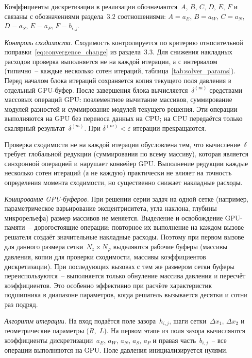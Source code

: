 Коэффициенты дискретизации в реализации обозначаются~$A$, $B$, $C$, $D$, $E$, $F$ и связаны с обозначениями раздела~3.2 соотношениями: $A = a_E$, $B = a_W$, $C = a_N$, $D = a_S$, $E = a_P$, $F = b_{i,j}$.

\textit{Контроль сходимости.}
Сходимость контролируется по критерию относительной поправки~\eqref{eq:convergence_change} из раздела~3.3. Для снижения накладных расходов проверка выполняется не на каждой итерации, а с интервалом (типично~-- каждые несколько сотен итераций, таблица~\ref{tab:solver_params}). Перед началом блока итераций сохраняется копия текущего поля давления в отдельный GPU-буфер. После завершения блока вычисляется~$\delta^{(m)}$ средствами массовых операций GPU: поэлементное вычитание массивов, суммирование модулей разностей и суммирование модулей текущего решения. Эти операции выполняются на GPU без переноса данных на CPU; на CPU передаётся только скалярный результат~$\delta^{(m)}$. При $\delta^{(m)} < \varepsilon$ итерации прекращаются.

Проверка сходимости не на каждой итерации обусловлена тем, что вычисление~$\delta$ требует глобальной редукции (суммирования по всему массиву), которая является синхронной операцией и нарушает конвейер GPU. Выполнение редукции каждые несколько сотен итераций (а не каждую) практически не влияет на точность определения момента сходимости, но существенно снижает накладные расходы.

\textit{Кэширование GPU-буферов.}
При решении серии задач на одной сетке (например, параметрическое варьирование эксцентриситета, угла наклона, глубины микрорельефа) размер массивов не меняется. Выделение и освобождение GPU-памяти~-- дорогостоящие операции; повторное их выполнение на каждом вызове решателя создаёт значительные накладные расходы. Поэтому при первом вызове для данного размера сетки~$N_z \times N_\varphi$ выделяются рабочие буферы (массивы давления, копии для проверки сходимости, массивы коэффициентов дискретизации). При последующих вызовах с тем же размером сетки буферы переиспользуются~-- выполняется только обнуление массива давления и пересчёт коэффициентов. Это особенно эффективно при расчёте характеристик подшипника в диапазоне параметров, когда решатель вызывается десятки и сотни раз подряд.

\textit{Алгоритм итерации.}
На вход подаётся поле зазора~$h_{i,j}$, шаги сетки~$\Delta x_1$, $\Delta x_2$ и геометрические параметры ($R$,~$L$). На первом этапе из поля зазора вычисляются коэффициенты дискретизации~$a_E$, $a_W$, $a_N$, $a_S$, $a_P$ и правая часть~$b_{i,j}$~-- все операции выполняются на GPU. Поле давления инициализируется нулями.

